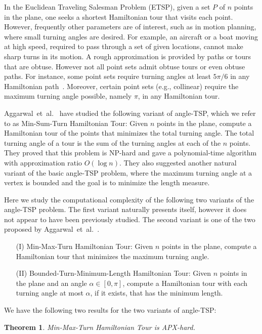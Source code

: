 \documentclass[letterpaper,11pt]{article}
\newtheorem{theorem}{Theorem}
\def\etal{{et~al.}}
\def\eg{{e.g.}}
\begin{document}
In the {\sc Euclidean Traveling Salesman Problem} (ETSP),
given a set $P$ of $n$ points in the plane,
one seeks a shortest Hamiltonian tour that visits each point.
However, frequently other parameters are of interest,
such as in motion planning, where small turning angles are desired.
For example, an aircraft or a boat moving at high speed,
required to pass through a set of given locations,
cannot make sharp turns in its
motion\cite{ACKMS99,ART95,BCL94,Fr89,JC89,LFF07}. 
A rough approximation is provided by paths or tours that are obtuse.
However not all point sets admit obtuse tours or even obtuse paths.
For instance, some point sets require turning angles
at least $5\pi/6$ in any Hamiltonian path~\cite{FW97}.
Moreover, certain point sets (\eg, collinear)
require the maximum turning angle possible, namely $\pi$,
in any Hamiltonian tour.

Aggarwal~\etal~\cite{ACKMS99} have studied the following variant of angle-TSP,
which we refer to as {\sc Min-Sum-Turn Hamiltonian Tour}:
Given $n$ points in the plane,
compute a Hamiltonian tour of the points
that minimizes the total turning angle.
The total turning angle of a tour is the sum of the turning
angles at each of the $n$ points.
They proved that this problem is NP-hard and gave a polynomial-time algorithm
with approximation ratio $O(\log n)$.
They also suggested another natural variant of the basic angle-TSP problem,
where the maximum turning angle at a vertex is bounded and the goal is
to minimize the length measure.

Here we study the computational complexity
of the following two variants of the angle-TSP problem.
The first variant naturally presents itself, however it does not
appear to have been previously studied.
The second variant is one of the two proposed by Aggarwal~\etal~\cite{ACKMS99}.
\begin{itemize} \itemsep -1pt
\item[(I)]
{\sc Min-Max-Turn Hamiltonian Tour}:
Given $n$ points in the plane,
compute a Hamiltonian tour that minimizes the maximum turning angle.
\item[(II)]
{\sc Bounded-Turn-Minimum-Length Hamiltonian Tour}:
Given $n$ points in the plane and an angle $\alpha \in [0,\pi]$,
compute a Hamiltonian tour with each turning angle at most $\alpha$,
if it exists, that has the minimum length.
\end{itemize}


We have the following two results for the two variants of angle-TSP:

\begin{theorem}\label{thm:hamiltonian}
{\sc Min-Max-Turn Hamiltonian Tour} is APX-hard.
\end{theorem}
\end{document}
